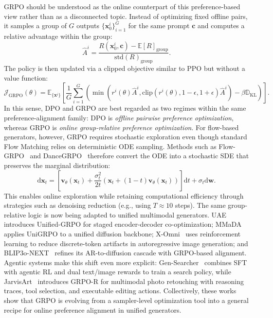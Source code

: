 \documentclass{llmxive}
\providecommand{\vx}{\mathbf{x}}
\providecommand{\vc}{\mathbf{c}}
\providecommand{\vv}{\mathbf{v}}
\providecommand{\vw}{\mathbf{w}}
\begin{document}
GRPO should be understood as the online counterpart of this preference-based view rather than as a disconnected topic. Instead of optimizing fixed offline pairs, it samples a group of $G$ outputs $\{\vx_0^i\}_{i=1}^G$ for the same prompt $\vc$ and computes a relative advantage within the group:
\begin{equation}
\hat{A}^i = \frac{R(\vx^i_0, \vc) - \mathbb{E}[R]_{\text{group}}}{\text{std}(R)_{\text{group}}}.
\end{equation}
The policy is then updated via a clipped objective similar to PPO but without a value function:
\begin{equation}
\mathcal{J}_{\text{GRPO}}(\theta) = \mathbb{E}_{\{\vx^i\}} \left[ \frac{1}{G}\sum_{i=1}^{G} \left( \min \left( r^i(\theta) \hat{A}^i, \text{clip}(r^i(\theta), 1-\epsilon, 1+\epsilon)\hat{A}^i \right) - \beta \mathbb{D}_{\text{KL}} \right) \right].
\end{equation}
In this sense, DPO and GRPO are best regarded as two regimes within the same preference-alignment family: DPO is \emph{offline pairwise preference optimization}, whereas GRPO is \emph{online group-relative preference optimization}. For flow-based generators, however, GRPO requires stochastic exploration even though standard Flow Matching relies on deterministic ODE sampling. Methods such as Flow-GRPO~\citep{liu2025flow} and DanceGRPO~\citep{xue2025dancegrpo} therefore convert the ODE into a stochastic SDE that preserves the marginal distribution:
\begin{equation}
    \mathrm{d} \vx_t = \left[\vv_\theta(\vx_t) + \frac{\sigma_t^2}{2t}\left(\vx_t + (1-t)\vv_\theta(\vx_t)\right)\right] \mathrm{d} t + \sigma_t \mathrm{d} \vw.
\end{equation}
This enables online exploration while retaining computational efficiency through strategies such as denoising reduction (e.g., using $T \approx 10$ steps). The same group-relative logic is now being adapted to unified multimodal generators. UAE~\citep{yan2025uae} introduces Unified-GRPO for staged encoder-decoder co-optimization; MMaDA~\citep{yang2025mmada} applies UniGRPO to a unified diffusion backbone; X-Omni~\citep{geng2025xomni} uses reinforcement learning to reduce discrete-token artifacts in autoregressive image generation; and BLIP3o-NEXT~\citep{chen2025blip3onext} refines its AR-to-diffusion cascade with GRPO-based alignment. Agentic systems make this shift even more explicit: Gen-Searcher~\citep{feng2026gen} combines SFT with agentic RL and dual text/image rewards to train a search policy, while JarvisArt~\citep{lin2025jarvisart} introduces GRPO-R for multimodal photo retouching with reasoning traces, tool selection, and executable editing actions. Collectively, these works show that GRPO is evolving from a sampler-level optimization tool into a general recipe for online preference alignment in unified generators.
\end{document}
